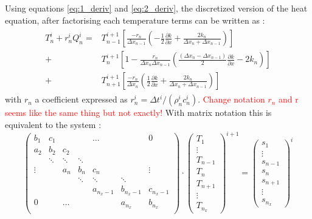 \documentclass[]{interact}
\theoremstyle{plain}%
\theoremstyle{definition}
\theoremstyle{remark}
\begin{document}
Using equations \ref{eq:1_deriv} and \ref{eq:2_deriv}, the discretized version of the heat equation, after factorising each temperature terms can be written as :
\begin{align}
\begin{split}
	T_n^i + r_n^i Q_n^i = &T_{n-1}^{i+1}  \left[ \frac{-r_n}{\Delta x_{n-1}} \left( - \frac{1}{2} \frac{\partial k}{ \partial x} + \frac{2 k_n}{\Delta x_n + \Delta x_{n-1}} \right)  \right] \\
	+ &T_{n}^{i+1} \left[ 1 - \frac{r_n}{\Delta x_{n}\Delta x_{n-1}} \left( \frac{\left(\Delta x_{n}- \Delta x_{n-1} \right)}{2} \frac{\partial k}{ \partial x} - 2 k_n \right) \right] \\
      + &T_{n+1}^{i+1}\left[ \frac{-r_n}{\Delta x_{n}} \left( \frac{1}{2} \frac{\partial k}{ \partial x} + \frac{2 k_n}{\Delta x_n + \Delta x_{n-1}} \right) \right]
\end{split}
    \label{eq:dis_heat}
\end{align}
with $r_n$ a coefficient expressed as $r_n^i = \Delta t^i / (\rho_n^i c_n^i)$.
\textcolor{red}{Change notation $r_n$ and r seems like the same thing but not exactly!}
With matrix notation this is equivalent to the system :
\begin{equation}
    \begin{pmatrix}
    b_1 & c_1 & &  &\hdots  & & 0  \\
    a_2 & b_2 & c_2 &  \\
      &\ddots & \ddots & \ddots     \\
    \vdots  &  & a_n & b_n & c_n & &  \vdots \\
    & & &\ddots & \ddots & \ddots     \\
    & & &  & a_{n_x-1} & b_{n_x-1} & c_{n_x-1} \\
    0 & &  \hdots & & & a_{n_x} & b_{n_x}  \\
    \end{pmatrix}
    \cdot
    \begin{pmatrix}
    T_{1} \\
    \vdots \\
    T_{n-1} \\
    T_{n}  \\
    T_{n+1} \\
    \vdots \\
    T_{n_x}
    \end{pmatrix}^{i+1}
     = 
     \begin{pmatrix}
        s_{1} \\
        \vdots \\
        s_{n-1} \\
        s_{n}  \\
        s_{n+1} \\
        \vdots \\
        s_{n_x}
        \end{pmatrix}^{i}
\end{equation}
\end{document}
